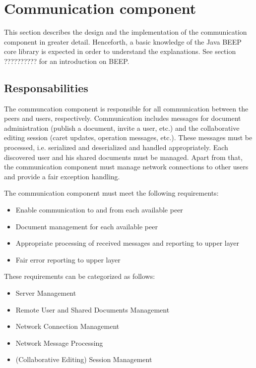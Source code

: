 

\section{Communication component}
This section describes the design and the implementation of the communication component in greater detail. Henceforth, a basic knowledge of the Java BEEP core library is expected in order to understand the explanations. See section ?????????? for an introduction on BEEP.

\subsection{Responsabilities}
The communcation component is responsible for all communication between the peers and users, respectively. Communication includes messages for document administration (publish a document, invite a user, etc.) and the collaborative editing session (caret updates, operation messages, etc.). These messages must be processed, i.e. serialized and deserialized and handled appropriately. Each discovered user and his shared documents must be managed. 
Apart from that, the communication component must manage network connections to other users and provide a fair exception handling.

The communication component must meet the following requirements:

\begin{itemize}
 \item Enable communication to and from each available peer
 \item Document management for each available peer
 \item Appropriate processing of received messages and reporting to upper layer
 \item Fair error reporting to upper layer
\end{itemize}

These requirements can be categorized as follows:

\begin{itemize}
 \item Server Management
 \item Remote User and Shared Documents Management
 \item Network Connection Management
 \item Network Message Processing
 \item (Collaborative Editing) Session Management
\end{itemize}

